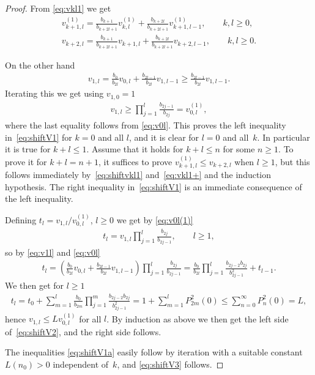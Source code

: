 \documentclass[pdftex]{sigma}
\numberwithin{equation}{section}
\begin{document}
\begin{proof} From \eqref{eq:vkl1} we get
\begin{gather}\label{eq:shiftvkl1}
 v_{k+1,l}^{(1)}=\frac{b_{k+1}}{b_{k+2l+1}}v_{k,l}^{(1)}+ \frac{b_{k+2l}}{b_{k+2l+1}}v_{k+1,l-1}^{(1)},\qquad k,l\ge 0,\\
 \label{eq:vkl1+}
v_{k+2,l}=\frac{b_{k+1}}{b_{k+2l+1}}v_{k+1,l}+ \frac{b_{k+2l}}{b_{k+2l+1}}v_{k+2,l-1},\qquad k,l\ge 0.
\end{gather}

On the other hand
\begin{gather}\label{eq:v1l}
v_{1,l}=\frac{b_0}{b_{2l}} v_{0,l}+\frac{b_{2l-1}}{ b_{2l}}v_{1,l-1}\ge \frac{b_{2l-1}}{ b_{2l}}v_{1,l-1}.
\end{gather}
Iterating this we get using $v_{1,0}=1$
\begin{gather}\label{eq:v0l(1)}
v_{1,l}\ge \prod_{j=1}^l \frac{b_{2j-1}}{b_{2j}}=v_{0,l}^{(1)},
\end{gather}
where the last equality follows from \eqref{eq:v0l}. This proves the left inequality in~\eqref{eq:shiftV1} for $k=0$ and all $l$, and it is clear for $l=0$ and all~$k$. In particular it is true for $k+l\le 1$. Assume that it holds for $k+l\le n$ for some $n\ge 1$. To prove it for $k+l=n+1$, it suffices to prove $v_{k+1,l}^{(1)}\le v_{k+2,l}$ when $l\ge 1$, but this follows immediately by~\eqref{eq:shiftvkl1} and~\eqref{eq:vkl1+} and the induction hypothesis. The right inequality in~\eqref{eq:shiftV1} is an immediate consequence of the left inequality.

Defining $t_l=v_{1,l}/v_{0,l}^{(1)}$, $l\ge 0$ we get by \eqref{eq:v0l(1)}
\begin{gather*}
t_l=v_{1,l}\prod_{j=1}^l \frac{b_{2j}}{b_{2j-1}},\qquad l\ge 1,
\end{gather*}
so by \eqref{eq:v1l} and \eqref{eq:v0l}
\begin{gather*}
t_l=\left(\frac{b_0}{b_{2l}}v_{0,l}+\frac{b_{2l-1}}{b_{2l}}v_{1,l-1}\right)\prod_{j=1}^l \frac{b_{2j}}{b_{2j-1}}=\frac{b_0}{b_{2l}}\prod_{j=1}^l\frac{b_{2j-2}b_{2j}}{b_{2j-1}^2} + t_{l-1}.
\end{gather*}
We then get for $l\ge 1$
\begin{gather*}
t_l=t_0+\sum_{m=1}^l \frac{b_0}{b_{2m}}\prod_{j=1}^m \frac{b_{2j-2}b_{2j}}{b_{2j-1}^2} =1+\sum_{m=1}^l P_{2m}^2(0)\le \sum_{n=0}^\infty P_n^2(0)=L,
\end{gather*}
hence $v_{1,l}\le L v_{0,l}^{(1)}$ for all $l$. By induction as above we then get the left side of~\eqref{eq:shiftV2}, and the right side follows.

The inequalities \eqref{eq:shiftV1a} easily follow by iteration with a suitable constant $L(n_0)>0$ independent of~$k$, and \eqref{eq:shiftV3} follows.
\end{proof}
\end{document}
